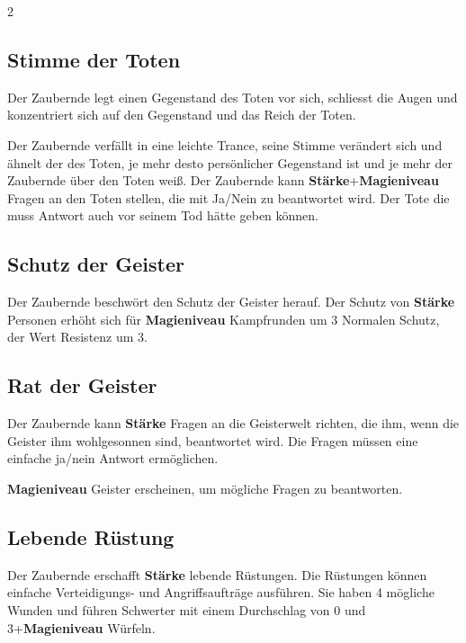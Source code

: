 \begin{multicols*}{2}
\subsection{Stimme der Toten}

Der Zaubernde legt einen Gegenstand des Toten vor sich, schliesst die Augen und konzentriert sich auf den Gegenstand und das Reich der Toten.

Der Zaubernde verfällt in eine leichte Trance, seine Stimme verändert sich und ähnelt der des Toten, je mehr desto persönlicher Gegenstand ist und je mehr der Zaubernde über den Toten weiß. Der Zaubernde kann \textbf{Stärke}+\textbf{Magieniveau} Fragen an den Toten stellen, die mit Ja/Nein zu beantwortet wird. Der Tote die muss Antwort auch vor seinem Tod hätte geben können.



\subsection{Schutz der Geister}

Der Zaubernde beschwört den Schutz der Geister herauf. Der Schutz von \textbf{Stärke} Personen erhöht sich für \textbf{Magieniveau} Kampfrunden um 3 Normalen Schutz, der Wert Resistenz um 3.



\subsection{Rat der Geister}

Der Zaubernde kann \textbf{Stärke} Fragen an die Geisterwelt richten, die ihm, wenn die Geister ihm wohlgesonnen sind, beantwortet wird. Die Fragen müssen eine einfache ja/nein Antwort ermöglichen.

\textbf{Magieniveau} Geister erscheinen, um mögliche Fragen zu beantworten.



\subsection{Lebende Rüstung}

Der Zaubernde erschafft \textbf{Stärke} lebende Rüstungen. Die Rüstungen können einfache Verteidigungs- und Angriffsaufträge ausführen. Sie haben 4 mögliche Wunden und führen Schwerter mit einem Durchschlag von 0 und 3+\textbf{Magieniveau} Würfeln.


\end{multicols*}
